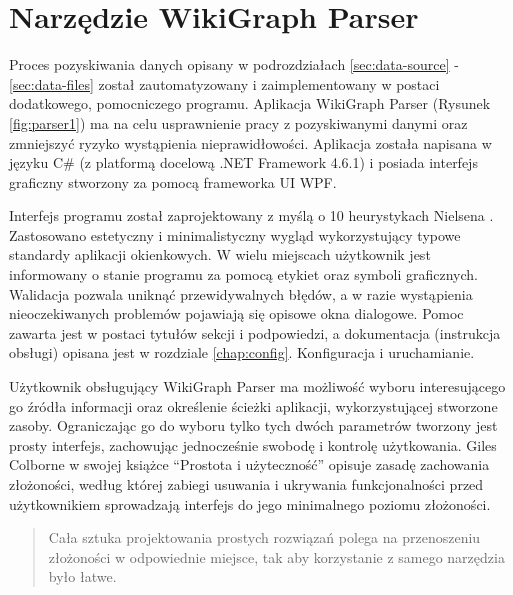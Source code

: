 \section{Narzędzie WikiGraph Parser}
\label{sec:parser-tool}
Proces pozyskiwania danych opisany w podrozdziałach \ref{sec:data-source} - \ref{sec:data-files} został zautomatyzowany i zaimplementowany w postaci dodatkowego, pomocniczego programu. Aplikacja WikiGraph Parser (Rysunek \ref{fig:parser1}) ma na celu usprawnienie pracy z pozyskiwanymi danymi oraz zmniejszyć ryzyko wystąpienia nieprawidłowości. Aplikacja została napisana w języku C\# (z platformą docelową .NET Framework 4.6.1) i posiada interfejs graficzny stworzony za pomocą frameworka UI WPF.

Interfejs programu został zaprojektowany z myślą o 10 heurystykach Nielsena \cite{Heuristics}. Zastosowano estetyczny i minimalistyczny wygląd wykorzystujący typowe standardy aplikacji okienkowych. W wielu miejscach użytkownik jest informowany o stanie programu za pomocą etykiet oraz symboli graficznych. Walidacja pozwala uniknąć przewidywalnych błędów, a w razie wystąpienia nieoczekiwanych problemów pojawiają się opisowe okna dialogowe. Pomoc zawarta jest w postaci tytułów sekcji i podpowiedzi, a dokumentacja (instrukcja obsługi) opisana jest w rozdziale \ref{chap:config}. Konfiguracja i uruchamianie.


Użytkownik obsługujący WikiGraph Parser ma możliwość wyboru interesującego go źródła informacji oraz określenie ścieżki aplikacji, wykorzystującej stworzone zasoby. Ograniczając go do wyboru tylko tych dwóch parametrów tworzony jest prosty interfejs, zachowując jednocześnie swobodę i kontrolę użytkowania. Giles Colborne w swojej książce ``Prostota i użyteczność'' \cite{ProstotaUzytecznosc} opisuje zasadę zachowania złożoności, według której zabiegi usuwania i ukrywania funkcjonalności przed użytkownikiem sprowadzają interfejs do jego minimalnego poziomu złożoności.

\begin{center}
	\hyphenblockcquote{polish}{ProstotaUzytecznosc}{
        Cała sztuka projektowania prostych rozwiązań polega na przenoszeniu złożoności w odpowiednie miejsce, tak aby korzystanie z samego narzędzia było łatwe.
	}
\end{center}


